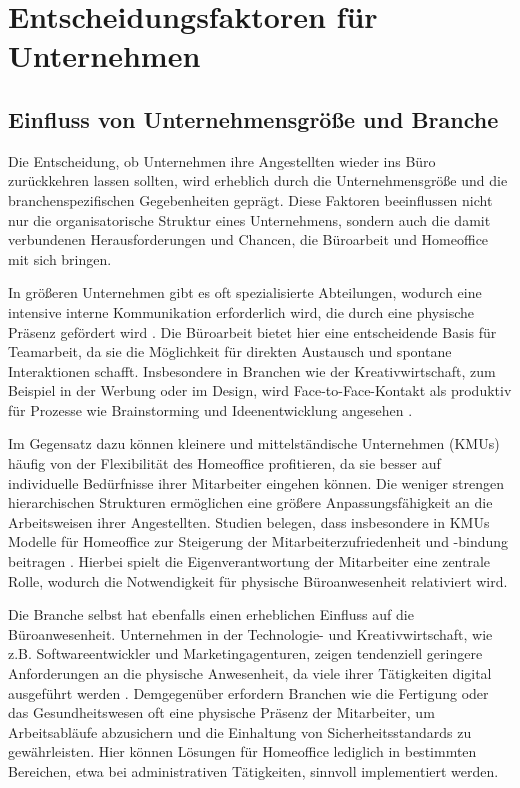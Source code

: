 \section{Entscheidungsfaktoren für Unternehmen}

\subsection{Einfluss von Unternehmensgröße und Branche}

Die Entscheidung, ob Unternehmen ihre Angestellten wieder ins Büro zurückkehren lassen sollten, wird erheblich durch die Unternehmensgröße und die branchenspezifischen Gegebenheiten geprägt. Diese Faktoren beeinflussen nicht nur die organisatorische Struktur eines Unternehmens, sondern auch die damit verbundenen Herausforderungen und Chancen, die Büroarbeit und Homeoffice mit sich bringen.

In größeren Unternehmen gibt es oft spezialisierte Abteilungen, wodurch eine intensive interne Kommunikation erforderlich wird, die durch eine physische Präsenz gefördert wird \cite{Autor, Jahr}. Die Büroarbeit bietet hier eine entscheidende Basis für Teamarbeit, da sie die Möglichkeit für direkten Austausch und spontane Interaktionen schafft. Insbesondere in Branchen wie der Kreativwirtschaft, zum Beispiel in der Werbung oder im Design, wird Face-to-Face-Kontakt als produktiv für Prozesse wie Brainstorming und Ideenentwicklung angesehen \cite{Autor, Jahr}.

Im Gegensatz dazu können kleinere und mittelständische Unternehmen (KMUs) häufig von der Flexibilität des Homeoffice profitieren, da sie besser auf individuelle Bedürfnisse ihrer Mitarbeiter eingehen können. Die weniger strengen hierarchischen Strukturen ermöglichen eine größere Anpassungsfähigkeit an die Arbeitsweisen ihrer Angestellten. Studien belegen, dass insbesondere in KMUs Modelle für Homeoffice zur Steigerung der Mitarbeiterzufriedenheit und -bindung beitragen \cite{Autor, Jahr}. Hierbei spielt die Eigenverantwortung der Mitarbeiter eine zentrale Rolle, wodurch die Notwendigkeit für physische Büroanwesenheit relativiert wird.

Die Branche selbst hat ebenfalls einen erheblichen Einfluss auf die Büroanwesenheit. Unternehmen in der Technologie- und Kreativwirtschaft, wie z.B. Softwareentwickler und Marketingagenturen, zeigen tendenziell geringere Anforderungen an die physische Anwesenheit, da viele ihrer Tätigkeiten digital ausgeführt werden \cite{Autor, Jahr}. Demgegenüber erfordern Branchen wie die Fertigung oder das Gesundheitswesen oft eine physische Präsenz der Mitarbeiter, um Arbeitsabläufe abzusichern und die Einhaltung von Sicherheitsstandards zu gewährleisten. Hier können Lösungen für Homeoffice lediglich in bestimmten Bereichen, etwa bei administrativen Tätigkeiten, sinnvoll implementiert werden.

